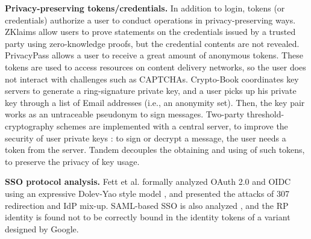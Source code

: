 \vspace{1mm}
\noindent\textbf{Privacy-preserving tokens/credentials.}
In addition to login,
    tokens (or credentials) authorize a user to conduct operations
        in privacy-preserving ways.
ZKlaims \cite{zklaim} allow users to prove statements on the credentials issued by a trusted party
    using zero-knowledge proofs,
        but the credential contents are not revealed.
PrivacyPass \cite{privacypass} allows a user to receive a great amount of anonymous tokens.
 These tokens are used to access resources on content delivery networks,
    so  the user does not interact with challenges such as CAPTCHAs.
Crypto-Book \cite{crypto-book} coordinates key servers to generate a ring-signature private key,
 and a user picks up his private key through a list of Email addresses (i.e., an anonymity set).
 Then, the key pair works as an untraceable pseudonym to sign messages.
Two-party threshold-cryptography schemes are implemented with a central server,
    to improve the security of user private keys \cite{mRSA,ss-rsa}:
    to sign or decrypt a message, the user needs a token from the server.
    Tandem \cite{tandem} decouples the obtaining and using of such tokens,
to preserve the privacy of key usage.

\vspace{1mm}
\noindent\textbf{SSO protocol analysis.}
Fett et al. \cite{FettKS16, FettKS17} formally analyzed OAuth 2.0 and OIDC using an expressive Dolev-Yao style model \cite{FettKS14},
    and presented the attacks of 307 redirection and IdP mix-up.
SAML-based SSO is also analyzed \cite{ArmandoCCCT08},
    and the RP identity is found not to be correctly bound in the identity tokens of a variant designed by Google.



